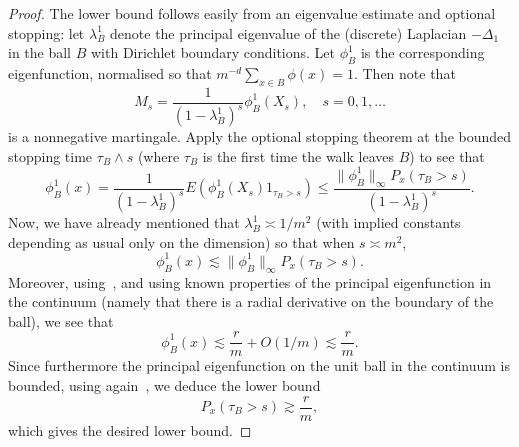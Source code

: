 \documentclass[10pt]{amsart}
\theoremstyle{definition}\newtheorem{defi}[theo]{Definition}\newtheorem{rema}[theo]{Remark}\newtheorem{exam}[theo]{Example}\newtheorem{exem}[theo]{Example}\newtheorem{nota}[theo]{Notation}
\newcommand{\Pmh}{P}
\newcommand*\E {{E}}
\begin{document}
\begin{proof}
The lower bound follows easily from an eigenvalue estimate and optional stopping: let $\lambda^1_B$ denote the principal eigenvalue of the (discrete) Laplacian $-\Delta_1$ in the ball $B$ with Dirichlet boundary conditions. Let $\phi^1_B$ is the corresponding eigenfunction, normalised so that $m^{-d} \sum_{x \in B} \phi(x) = 1$.
Then note that
\[
M_s = \frac{1}{(1-\lambda_B^1)^s} \phi_B^1 (X_s),\quad s = 0, 1, \ldots
\]
is a nonnegative martingale. Apply the optional stopping theorem at the bounded stopping time $\tau_B \wedge s$ (where $\tau_B$ is the first time the walk leaves $B$) to see that
\[
\phi_B^1 (x) = \frac1{(1- \lambda_B^1)^s} \E\left(\phi_B^1(X_s) 1_{\tau_B > s}\right)\le \frac{\| \phi_B^1\|_\infty \Pmh_x(\tau_B > s)}{ (1- \lambda_B^1)^s}.
\]
Now, we have already mentioned that $\lambda_B^1 \asymp 1/m^2$ (with implied constants depending as usual only on the dimension) so that when $s \asymp m^2$,
\[
\phi_B^1 (x) \lesssim \| \phi_B^1\|_\infty \Pmh_x(\tau_B > s).
\]
Moreover, using~\cite[Lemma~2.1]{BO}, and using known properties of the principal eigenfunction in the continuum (namely that there is a radial derivative on the boundary of the ball), we see that
\[
\phi_B^1 (x) \lesssim \frac{r }{ m} + O(1/m) \lesssim \frac{r }{ m}.
\]
Since furthermore the principal eigenfunction on the unit ball in the continuum is bounded, using again~\cite[Lemma~2.1]{BO}, we deduce the lower bound
\begin{equation}\label{Tball}
\Pmh_x (\tau_B > s) \gtrsim \frac{r }{ m},
\end{equation}
which gives the desired lower bound.


\end{proof}
\end{document}
